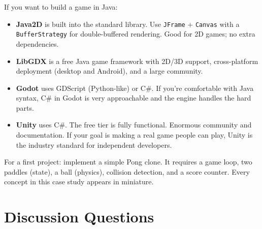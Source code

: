 \documentclass[11pt,letterpaper]{article}
\begin{document}
\begin{tipbox}
If you want to build a game in Java:
\begin{itemize}[itemsep=4pt]
    \item \textbf{Java2D} is built into the standard library. Use \texttt{JFrame} + \texttt{Canvas} with a \texttt{BufferStrategy} for double-buffered rendering. Good for 2D games; no extra dependencies.
    \item \textbf{LibGDX} is a free Java game framework with 2D/3D support, cross-platform deployment (desktop and Android), and a large community.
    \item \textbf{Godot} uses GDScript (Python-like) or C\#. If you're comfortable with Java syntax, C\# in Godot is very approachable and the engine handles the hard parts.
    \item \textbf{Unity} uses C\#. The free tier is fully functional. Enormous community and documentation. If your goal is making a real game people can play, Unity is the industry standard for independent developers.
\end{itemize}
For a first project: implement a simple Pong clone. It requires a game loop, two paddles (state), a ball (physics), collision detection, and a score counter. Every concept in this case study appears in miniature.
\end{tipbox}

\section*{Discussion Questions}
\end{document}
